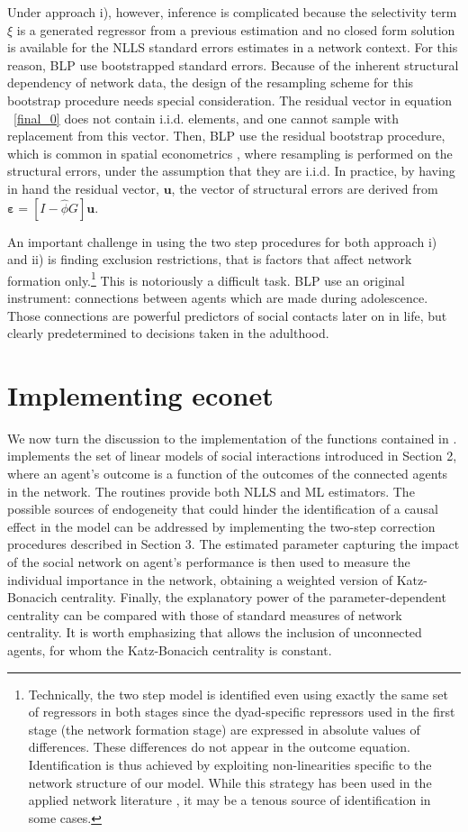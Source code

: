 \documentclass[nojss]{jss}
\begin{document}
Under approach i), however, inference is complicated because the
selectivity term $\xi$ is a generated regressor from a previous estimation and no closed form solution is available for the NLLS standard errors estimates in a network context. For this reason, BLP use bootstrapped standard errors. Because of the inherent structural dependency of network data, the design of the resampling scheme for this bootstrap procedure needs special consideration. The residual vector in equation ~\ref{final_0} does not contain i.i.d. elements, and one cannot sample with replacement from this vector. Then, BLP use the residual bootstrap procedure, which is common in spatial econometrics \citep[see][]{Anselin:1990}, where resampling is performed on the structural errors, under the assumption that they are i.i.d. In practice, by having in hand the residual vector, $\boldsymbol{u}$, the vector of structural errors are derived from $\mathbf{\varepsilon}=[I-\widehat{\phi}G]\boldsymbol{u}$.

An important challenge in using the two step procedures for both approach i) and ii) is finding exclusion restrictions, that is factors that affect network formation only.\footnote{Technically, the two step model is identified even using exactly the same set of regressors in both stages since the dyad-specific repressors used in the first stage (the network formation stage) are expressed in absolute values of differences. These differences do not appear in the outcome equation. Identification is thus achieved by exploiting non-linearities specific to the network structure of our model. While this strategy has been used in the applied network literature \citep[see e.g.,][]{GPI:2013,CSL:2016}, it may be a tenous source of identification in some cases.} This is notoriously a difficult task. BLP use an original instrument: connections between agents which are made during adolescence. Those connections are powerful predictors of social contacts later on in life, but clearly predetermined to decisions taken in the adulthood.

\section{Implementing econet}

We now turn the discussion to the implementation of the functions contained in .  implements the set of linear models of social interactions introduced in Section 2, where an agent's outcome is a function of the outcomes of the connected agents in the network. The routines provide both NLLS and ML estimators. The possible sources of endogeneity that could hinder the identification of a causal effect in the model can be addressed by implementing the two-step
correction procedures described in Section 3. The estimated parameter capturing the impact of the social network on agent's performance is then used to measure the individual importance in the network, obtaining a weighted version of Katz-Bonacich centrality. Finally, the explanatory power of the parameter-dependent centrality can be compared with those of standard measures of network centrality. It is worth emphasizing that  allows the inclusion of unconnected agents, for whom the Katz-Bonacich centrality is constant.
\end{document}
